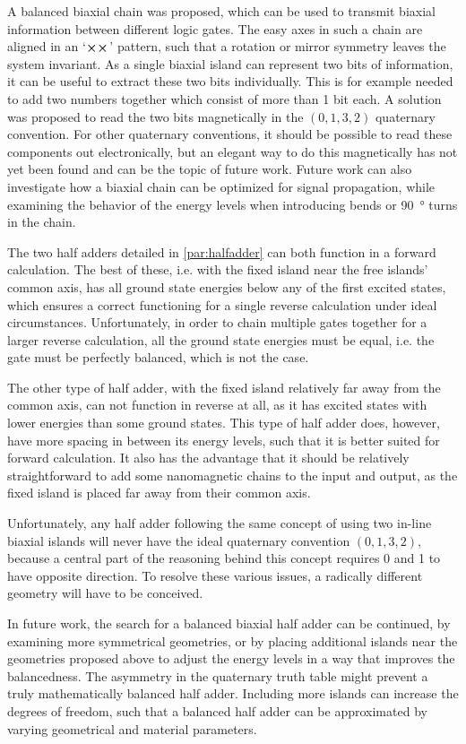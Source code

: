 \documentclass[11pt,a4paper,english,twoside]{article}
\begin{document}
A balanced biaxial chain was proposed, which can be used to transmit biaxial information between different logic gates. The easy axes in such a chain are aligned in an `$\cross \cross$' pattern, such that a rotation or mirror symmetry leaves the system invariant. As a single biaxial island can represent two bits of information, it can be useful to extract these two bits individually. This is for example needed to add two numbers together which consist of more than 1 bit each. A solution was proposed to read the two bits magnetically in the $(0,1,3,2)$ quaternary convention. For other quaternary conventions, it should be possible to read these components out electronically, but an elegant way to do this magnetically has not yet been found and can be the topic of future work. Future work can also investigate how a biaxial chain can be optimized for signal propagation, while examining the behavior of the energy levels when introducing bends or \SI{90}{\degree} turns in the chain. \par
The two half adders detailed in \cref{par:halfadder} can both function in a forward calculation. The best of these, i.e. with the fixed island near the free islands' common axis, has all ground state energies below any of the first excited states, which ensures a correct functioning for a single reverse calculation under ideal circumstances. Unfortunately, in order to chain multiple gates together for a larger reverse calculation, all the ground state energies must be equal, i.e. the gate must be perfectly balanced, which is not the case. \par
The other type of half adder, with the fixed island relatively far away from the common axis, can not function in reverse at all, as it has excited states with lower energies than some ground states. This type of half adder does, however, have more spacing in between its energy levels, such that it is better suited for forward calculation. It also has the advantage that it should be relatively straightforward to add some nanomagnetic chains to the input and output, as the fixed island is placed far away from their common axis. \par
Unfortunately, any half adder following the same concept of using two in-line biaxial islands will never have the ideal quaternary convention $(0,1,3,2)$, because a central part of the reasoning behind this concept requires 0 and 1 to have opposite direction. To resolve these various issues, a radically different geometry will have to be conceived. \par
In future work, the search for a balanced biaxial half adder can be continued, by examining more symmetrical geometries, or by placing additional islands near the geometries proposed above to adjust the energy levels in a way that improves the balancedness. The asymmetry in the quaternary truth table might prevent a truly mathematically balanced half adder. Including more islands can increase the degrees of freedom, such that a balanced half adder can be approximated by varying geometrical and material parameters.


\newpage


\end{document}
